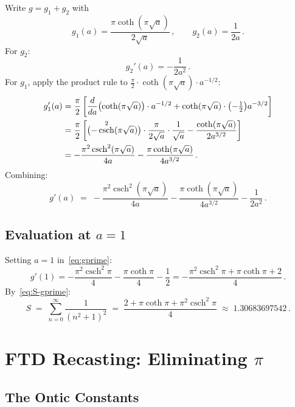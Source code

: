 \documentclass[12pt]{article}
\DeclareMathOperator{\csch}{csch}
\begin{document}
Write $g=g_1+g_2$ with
\[
g_1(a)=\frac{\pi\coth(\pi\sqrt{a})}{2\sqrt{a}}\,,\qquad
g_2(a)=\frac{1}{2a}\,.
\]
For $g_2$:
\begin{equation}\label{eq:g2prime}
g_2'(a)=-\frac{1}{2a^2}\,.
\end{equation}
For $g_1$, apply the product rule to
$\frac{\pi}{2}\cdot\coth(\pi\sqrt{a})\cdot a^{-1/2}$:
\begin{align}
g_1'(a)
&=\frac{\pi}{2}\left[\frac{d}{da}\bigl(\coth(\pi\sqrt{a})\bigr)\cdot a^{-1/2}
  +\coth(\pi\sqrt{a})\cdot\bigl(-\tfrac{1}{2}\bigr)a^{-3/2}\right]\notag\\
&=\frac{\pi}{2}\left[\bigl(-\csch^2(\pi\sqrt{a})\bigr)\cdot
  \frac{\pi}{2\sqrt{a}}\cdot\frac{1}{\sqrt{a}}
  -\frac{\coth(\pi\sqrt{a})}{2a^{3/2}}\right]\notag\\
&=-\frac{\pi^2\csch^2(\pi\sqrt{a})}{4a}
  -\frac{\pi\coth(\pi\sqrt{a})}{4a^{3/2}}\,.\label{eq:g1prime}
\end{align}
Combining:
\begin{equation}\label{eq:gprime}
g'(a)\;=\;
-\frac{\pi^2\csch^2(\pi\sqrt{a})}{4a}
-\frac{\pi\coth(\pi\sqrt{a})}{4a^{3/2}}
-\frac{1}{2a^2}\,.
\end{equation}

\subsection{Evaluation at $a=1$}

Setting $a=1$ in~\eqref{eq:gprime}:
\[
g'(1)=-\frac{\pi^2\csch^2\pi}{4}-\frac{\pi\coth\pi}{4}-\frac{1}{2}
=-\frac{\pi^2\csch^2\pi+\pi\coth\pi+2}{4}\,.
\]
By~\eqref{eq:S-gprime}:
\begin{equation}\label{eq:result}
\boxed{
S\;=\;\sum_{n=0}^{\infty}\frac{1}{(n^2+1)^2}
\;=\;\frac{2+\pi\coth\pi+\pi^2\csch^2\pi}{4}
\;\approx\;1.30683697542\,.
}
\end{equation}

\section{FTD Recasting: Eliminating $\pi$}\label{sec:ftd}

\subsection{The Ontic Constants}
\end{document}
